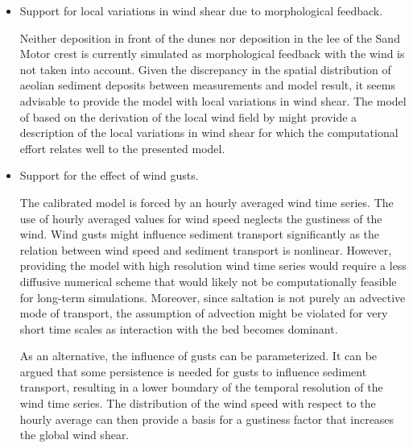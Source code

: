 \begin{itemize}
\item Support for local variations in wind shear due to morphological
  feedback.

  Neither deposition in front of the dunes nor deposition in the lee
  of the Sand Motor crest is currently simulated as morphological
  feedback with the wind is not taken into account. Given the
  discrepancy in the spatial distribution of aeolian sediment deposits
  between measurements and model result, it seems advisable to provide
  the model with local variations in wind shear. The model of
  \cite{Kroy2002} based on the derivation of the local wind field by
  \citet{Weng1991} might provide a description of the local variations
  in wind shear for which the computational effort relates well to the
  presented model.

%

\item Support for the effect of wind gusts.

  The calibrated model is forced by an hourly averaged wind time
  series. The use of hourly averaged values for wind speed neglects
  the gustiness of the wind. Wind gusts might influence sediment
  transport significantly as the relation between wind speed and
  sediment transport is nonlinear. However, providing the model with
  high resolution wind time series would require a less diffusive
  numerical scheme that would likely not be computationally feasible
  for long-term simulations. Moreover, since saltation is not purely
  an advective mode of transport, the assumption of advection might be
  violated for very short time scales as interaction with the bed
  becomes dominant.

  As an alternative, the influence of gusts can be parameterized. It
  can be argued that some persistence is needed for gusts to influence
  sediment transport, resulting in a lower boundary of the temporal
  resolution of the wind time series. The distribution of the wind
  speed with respect to the hourly average can then provide a basis
  for a gustiness factor that increases the global wind shear.


\end{itemize}
